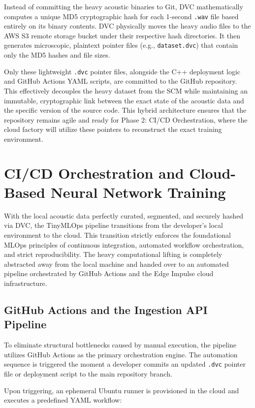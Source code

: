 \documentclass[11pt,a4paper,openany]{book}
\begin{document}
Instead of committing the heavy acoustic binaries to Git, DVC mathematically computes a unique MD5 cryptographic hash for each 1-second \texttt{.wav} file based entirely on its binary contents. DVC physically moves the heavy audio files to the AWS S3 remote storage bucket under their respective hash directories. It then generates microscopic, plaintext pointer files (e.g., \texttt{dataset.dvc}) that contain only the MD5 hashes and file sizes.

Only these lightweight \texttt{.dvc} pointer files, alongside the C++ deployment logic and GitHub Actions YAML scripts, are committed to the GitHub repository. This effectively decouples the heavy dataset from the SCM while maintaining an immutable, cryptographic link between the exact state of the acoustic data and the specific version of the source code. This hybrid architecture ensures that the repository remains agile and ready for Phase 2: CI/CD Orchestration, where the cloud factory will utilize these pointers to reconstruct the exact training environment.
\section{CI/CD Orchestration and Cloud-Based Neural Network Training}

With the local acoustic data perfectly curated, segmented, and securely hashed via DVC, the TinyMLOps pipeline transitions from the developer's local environment to the cloud. This transition strictly enforces the foundational MLOps principles of continuous integration, automated workflow orchestration, and strict reproducibility. The heavy computational lifting is completely abstracted away from the local machine and handed over to an automated pipeline orchestrated by GitHub Actions and the Edge Impulse cloud infrastructure.

\subsection{GitHub Actions and the Ingestion API Pipeline}
To eliminate structural bottlenecks caused by manual execution, the pipeline utilizes GitHub Actions as the primary orchestration engine. The automation sequence is triggered the moment a developer commits an updated \texttt{.dvc} pointer file or deployment script to the main repository branch.

Upon triggering, an ephemeral Ubuntu runner is provisioned in the cloud and executes a predefined YAML workflow:
\end{document}
